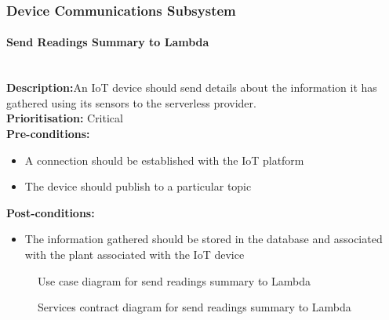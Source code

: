 \documentclass{article}
\begin{document}
\subsubsection{Device Communications Subsystem}
	\paragraph{Send Readings Summary to Lambda}\mbox{}\\
		\textbf{Description:}An IoT device should send details about the information it has gathered using its sensors to the serverless provider.\\
		\textbf{Prioritisation:} Critical\\		
		\textbf{Pre-conditions:}
			\begin{itemize}
				\item A connection should be established with the IoT platform
				\item The device should publish to a particular topic
			\end{itemize}
		\textbf{Post-conditions:}
			\begin{itemize}
				\item The information gathered should be stored in the database and associated with the plant associated with the IoT device
			\end{itemize}

		\begin{figure}[H]
			\caption{Use case diagram for send readings summary to Lambda}
		\end{figure}
		
		\begin{figure}[H]
			\caption{Services contract diagram for send readings summary to Lambda}
		\end{figure}
		
\end{document}
